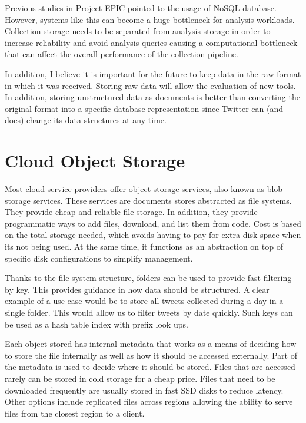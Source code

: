 Previous studies in Project EPIC pointed to the usage of NoSQL database. However, systems like this can become a huge bottleneck for analysis workloads. Collection storage needs to be separated from analysis storage in order to increase reliability and avoid analysis queries causing a computational bottleneck that can affect the overall performance of the collection pipeline. 

In addition, I believe it is important for the future to keep data in the raw format in which it was received. Storing raw data will allow the evaluation of new tools. In addition, storing unstructured data as documents is better than converting the original format into a specific database representation since Twitter can (and does) change its data structures at any time.  

\section{Cloud Object Storage}

Most cloud service providers offer object storage services, also known as blob storage services. These services are documents stores abstracted as file systems. They provide cheap and reliable file storage. In addition, they provide programmatic ways to add files, download, and list them from code. Cost is based on the total storage needed, which avoids having to pay for extra disk space when its not being used. At the same time, it functions as an abstraction on top of specific disk configurations to simplify management.

Thanks to the file system structure, folders can be used to provide fast filtering by key. This provides guidance in how data should be structured. A clear example of a use case would be to store all tweets collected during a day in a single folder. This would allow us to filter tweets by date quickly. Such keys can be used as a hash table index with prefix look ups. 

Each object stored has internal metadata that works as a means of deciding how to store the file internally as well as how it should be accessed externally. Part of the metadata is used to decide where it should be stored. Files that are accessed rarely can be stored in cold storage for a cheap price. Files that need to be downloaded frequently are usually stored in fast SSD disks to reduce latency. Other options include replicated files across regions allowing the ability to serve files from the closest region to a client. 

